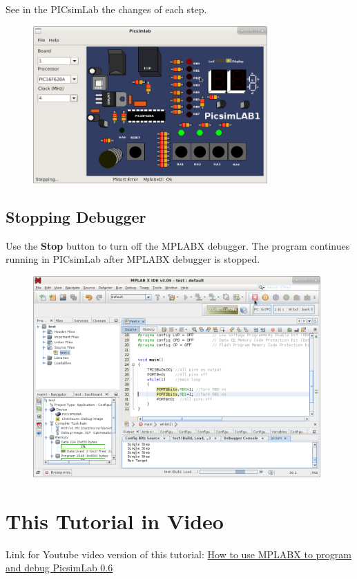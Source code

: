 See in the PICsimLab the changes of each step.
\begin{figure}[H]
\center
\includegraphics[width=0.8\textwidth]{img/hmd/mplab29.png} 
\end{figure} 

\subsection{Stopping Debugger}
Use the \textbf{Stop} button to turn off the MPLABX debugger. The program continues running in PICsimLab after MPLABX debugger is stopped.
\begin{figure}[H]
\center
\includegraphics[width=0.98\textwidth]{img/hmd/mplab30.png} 
\end{figure} 


\section{This Tutorial in Video}

Link for Youtube video version of this tutorial: \href{https://youtu.be/q2oZB50Avm4}{How to use MPLABX to program and debug PicsimLab 0.6}


